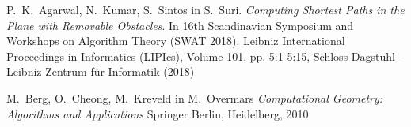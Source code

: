 \documentclass{article}
\begin{document}
\begin{thebibliography}{99}

     P.~K.~Agarwal, N.~Kumar, S.~Sintos in S.~Suri. \emph{Computing Shortest Paths in the Plane with Removable Obstacles}. In 16th Scandinavian Symposium and Workshops on Algorithm Theory (SWAT 2018). Leibniz International Proceedings in Informatics (LIPIcs), Volume 101, pp. 5:1-5:15, Schloss Dagstuhl – Leibniz-Zentrum für Informatik (2018)

     M.~Berg, O.~Cheong, M.~Kreveld in  M.~Overmars \emph{Computational Geometry: Algorithms and Applications} Springer Berlin, Heidelberg, 2010

\end{thebibliography}
\end{document}
